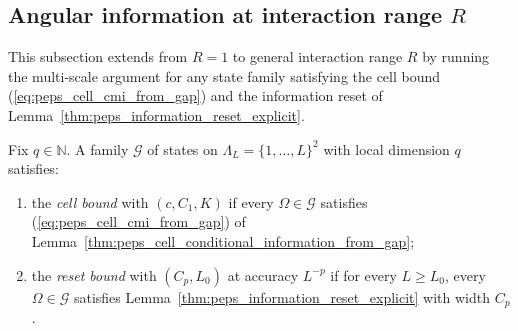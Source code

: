 \subsection{Angular information at interaction range $R$}

This subsection extends \cite[Proposition~3.4]{OpenAI2026PolynomialPEPS} from $R=1$ to general interaction range $R$ by running the multi-scale argument for any state family satisfying the cell bound (\ref{eq:peps_cell_cmi_from_gap}) and the information reset of Lemma~\ref{thm:peps_information_reset_explicit}.

\begin{definition}
    \label{def:peps_family_cell_reset_bounds}
    \leanok
    Fix $q\in\mathbb N$. A family $\mathcal G$ of states on $\Lambda_L=\{1,\ldots,L\}^2$ with local dimension $q$ satisfies:
    \begin{enumerate}
        \item the \emph{cell bound} with $(c,C_1,K)$ if every $\Omega\in\mathcal G$ satisfies (\ref{eq:peps_cell_cmi_from_gap}) of Lemma~\ref{thm:peps_cell_conditional_information_from_gap};
        \item the \emph{reset bound} with $(C_p,L_0)$ at accuracy $L^{-p}$ if for every $L\ge L_0$, every $\Omega\in\mathcal G$ satisfies Lemma~\ref{thm:peps_information_reset_explicit} with width $C_p$.
    \end{enumerate}
\end{definition}

